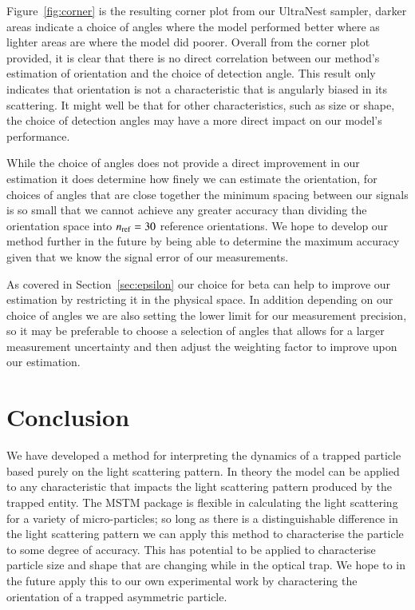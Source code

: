 \documentclass[final,  3p]{elsarticle}
\begin{document}
Figure~\ref{fig:corner} is the resulting corner plot from our UltraNest sampler, darker areas indicate a choice of angles where the model performed better where as lighter areas are where the model did poorer. Overall from the corner plot provided, it is clear that there is no direct correlation between our method's estimation of orientation and the choice of detection angle. This result only indicates that orientation is not a characteristic that is angularly biased in its scattering. It might well be that for other characteristics, such as size or shape, the choice of detection angles may have a more direct impact on our model's performance. 

While the choice of angles does not provide a direct improvement in our estimation it does determine how finely we can estimate the orientation, for choices of angles that are close together the minimum spacing between our signals is so small that we cannot achieve any greater accuracy than dividing the orientation space into $n_{\rm ref}=30$ reference orientations.  We hope to develop our method further in the future by being able to determine the maximum accuracy given that we know the signal error of our measurements. 

As covered in Section~\ref{sec:epsilon} our choice for beta can help to improve our estimation by restricting it in the physical space. In addition depending on our choice of angles we are also setting the lower limit for our measurement precision, so it may be preferable to choose a selection of angles that allows for a larger measurement uncertainty and then adjust the weighting factor to improve upon our estimation.
\section{Conclusion}
\label{sec:Conclusion}

We have developed a method for interpreting the dynamics of a trapped particle based purely on the light scattering pattern. In theory the model can be applied to any characteristic that impacts the light scattering pattern produced by the trapped entity. The MSTM package is flexible in calculating the light scattering for a variety of micro-particles; so long as there is a distinguishable difference in the light scattering pattern we can apply this method to characterise the particle to some degree of accuracy. This has potential to be applied to characterise particle size and shape that are changing while in the optical trap. We hope to in the future apply this to our own experimental work by charactering the orientation of a trapped asymmetric particle.\\
\end{document}

